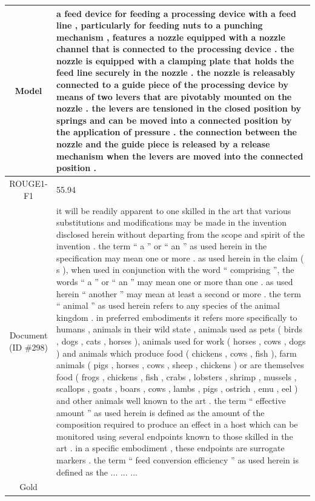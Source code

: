 \begin{table}[bth!]
\begin{tabular}{c|p{}}
\\ \hline
Model & 
a feed device for feeding a processing device with a feed line , particularly for feeding nuts to a punching mechanism , features a nozzle equipped with a nozzle channel that is connected to the processing device . the nozzle is equipped with a clamping plate that holds the feed line securely in the nozzle . the nozzle is releasably connected to a guide piece of the processing device by means of two levers that are pivotably mounted on the nozzle . the levers are tensioned in the closed position by springs and can be moved into a connected position by the application of pressure . the connection between the nozzle and the guide piece is released by a release mechanism when the levers are moved into the connected position .
\\ \hline
ROUGE1-F1 & 
55.94
\\ \hline
\makecell{Document\\(ID \#298)} & 
it will be readily apparent to one skilled in the art that various substitutions and modifications may be made in the invention disclosed herein without departing from the scope and spirit of the invention . the term “ a ” or “ an ” as used herein in the specification may mean one or more . as used herein in the claim ( s ), when used in conjunction with the word “ comprising ”, the words “ a ” or “ an ” may mean one or more than one . as used herein “ another ” may mean at least a second or more . the term “ animal ” as used herein refers to any species of the animal kingdom . in preferred embodiments it refers more specifically to humans , animals in their wild state , animals used as pets ( birds , dogs , cats , horses ), animals used for work ( horses , cows , dogs ) and animals which produce food ( chickens , cows , fish ), farm animals ( pigs , horses , cows , sheep , chickens ) or are themselves food ( frogs , chickens , fish , crabs , lobsters , shrimp , mussels , scallops , goats , boars , cows , lambs , pigs , ostrich , emu , eel ) and other animals well known to the art . the term “ effective amount ” as used herein is defined as the amount of the composition required to produce an effect in a host which can be monitored using several endpoints known to those skilled in the art . in a specific embodiment , these endpoints are surrogate markers . the term “ feed conversion efficiency ” as used herein is defined as the ... ... ... 
\\ \hline
Gold & 

\end{tabular}
\end{table}
